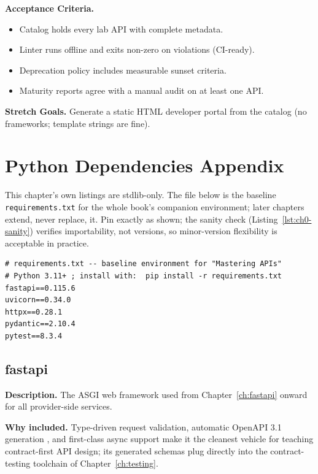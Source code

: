 \textbf{Acceptance Criteria.}
\begin{itemize}
  \item[$\square$] Catalog holds every lab API with complete metadata.
  \item[$\square$] Linter runs offline and exits non-zero on violations
    (CI-ready).
  \item[$\square$] Deprecation policy includes measurable sunset criteria.
  \item[$\square$] Maturity reports agree with a manual audit on at least
    one API.
\end{itemize}

\textbf{Stretch Goals.} Generate a static HTML developer portal from the
catalog (no frameworks; template strings are fine).

\section{Python Dependencies Appendix}
\label{sec:ch0-deps}

This chapter's own listings are stdlib-only. The file below is the baseline
\texttt{requirements.txt} for the whole book's companion environment; later
chapters extend, never replace, it. Pin exactly as shown; the sanity check
(Listing~\ref{lst:ch0-sanity}) verifies importability, not versions, so
minor-version flexibility is acceptable in practice.

\begin{verbatim}
# requirements.txt -- baseline environment for "Mastering APIs"
# Python 3.11+ ; install with:  pip install -r requirements.txt
fastapi==0.115.6
uvicorn==0.34.0
httpx==0.28.1
pydantic==2.10.4
pytest==8.3.4
\end{verbatim}

\subsection{fastapi}

\textbf{Description.} The ASGI web framework used from
Chapter~\ref{ch:fastapi} onward for all provider-side services.

\textbf{Why included.} Type-driven request validation, automatic OpenAPI 3.1
generation \cite{openapi31}, and first-class async support make it the
cleanest vehicle for teaching contract-first API design; its generated
schemas plug directly into the contract-testing toolchain of
Chapter~\ref{ch:testing}.

